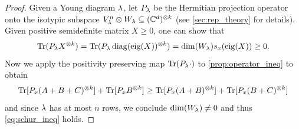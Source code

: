 \documentclass[notitlepage, 10pt]{article}
\begin{document}
\begin{proof}
    Given a Young diagram $\lambda$, let $P_{\lambda}$ be the Hermitian projection operator onto the isotypic subspace $V_{\lambda}^{n} \otimes W_{\lambda} \subseteq (\mathbb C^{d})^{\otimes k}$ (see \cref{sec:rep_theory} for details).
    Given positive semidefinite matrix $X \geq 0$, one can show that
    \begin{equation}
        \operatorname{Tr}(P_{\lambda}X^{\otimes k}) = \operatorname{Tr}(P_{\lambda}\operatorname{diag}(\operatorname{eig}(X))^{\otimes k}) = \dim(W_{\lambda}) s_{x}(\operatorname{eig}(X)) \geq 0.
    \end{equation}
    Now we apply the positivity preserving map $\operatorname{Tr}(P_{\lambda} \cdot )$ to \cref{prop:operator_ineq} to obtain
    \begin{equation}
        \operatorname{Tr}[P_{x}(A+B+C)^{\otimes k}] + \operatorname{Tr}[P_{x}B^{\otimes k}] \geq \operatorname{Tr}[P_{x}(A+B)^{\otimes k}] + \operatorname{Tr}[P_{x}(B+C)^{\otimes k}]
    \end{equation}
    and since $\lambda$ has at most $n$ rows, we conclude $\dim(W_{\lambda}) \neq 0$ and thus \cref{eq:schur_ineq} holds.
\end{proof}
\end{document}
